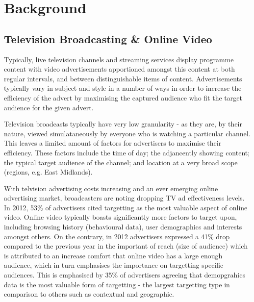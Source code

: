 \section{Background}

	\subsection{Television Broadcasting \& Online Video}

	Typically, live television channels and streaming services display programme content with video advertisements apportioned amongst this content at both regular intervals, and between distinguishable items of content. Advertisements typically vary in subject and style in a number of ways in order to increase the efficiency of the advert by maximising the captured audience who fit the target audience for the given advert.

	Television broadcasts typically have very low granularity - as they are, by their nature, viewed simulataneously by everyone who is watching a particular channel. This leaves a limited amount of factors for advertisers to maximise their efficiency. These factors include the time of day; the adjancently showing content; the typical target audience of the channel; and location at a very broad scope (regions, e.g. East Midlands).


	With telvision advertising costs increasing and an ever emerging online advertising market, broadcasters are noting dropping TV ad effectiveness levels. In 2012, 53\% of advertisers cited targetting as the most valuable aspect of online video. Online video typically boasts significantly more factors to target upon, including browsing history (behavioural data), user demographics and interests amongst others. On the contrary, in 2012 advertisers expressed a 41\% drop compared to the previous year in the important of reach (size of audience) which is attributed to an increase comfort that online video has a large enough audience, which in turn emphasises the importance on targetting specific audiences. This is emphasised by 35\% of advertisers agreeing that demopgrahics data is the most valuable form of targetting - the largest targetting type in comparison to others such as contextual and geographic. \citep{brightroll-report}


